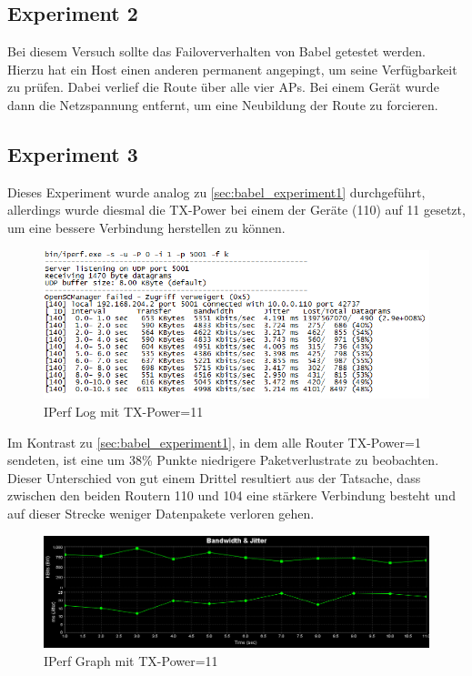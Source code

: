 \documentclass[10pt]{scrartcl}
\begin{document}
	
	\subsection{Experiment 2}
	Bei diesem Versuch sollte das Failoververhalten von Babel getestet werden. Hierzu hat ein Host einen anderen permanent angepingt, um seine Verfügbarkeit zu prüfen. Dabei verlief die Route über alle vier APs. Bei einem Gerät wurde dann die Netzspannung entfernt, um eine Neubildung der Route zu forcieren.
	
	\subsection{Experiment 3}\label{sec:babel_experiment3}
	Dieses Experiment wurde analog zu \ref{sec:babel_experiment1} durchgeführt, allerdings wurde diesmal die TX-Power bei einem der Geräte (110) auf 11 gesetzt, um eine bessere Verbindung herstellen zu können.	

	\begin{figure}
        \centering
                \includegraphics[width=\textwidth]{img/Babel_TX11_Protokoll}
        \caption{IPerf Log mit TX-Power=11}
        \label{img:babel_iperf_tx11}
	\end{figure}
	
Im Kontrast zu \ref{sec:babel_experiment1}, in dem alle Router TX-Power=1 sendeten, ist eine um 38\% Punkte niedrigere Paketverlustrate zu beobachten. Dieser Unterschied von gut einem Drittel resultiert aus der Tatsache, dass zwischen den beiden Routern 110 und 104 eine stärkere Verbindung besteht und auf dieser Strecke weniger Datenpakete verloren gehen.

	\begin{figure}
        \centering
                \includegraphics[width=\textwidth]{img/4_UDP_Babel_TX1_10MB}
        \caption{IPerf Graph mit TX-Power=11}
        \label{img:babel_iperf_graph_tx11}
	\end{figure}
	
\end{document}
